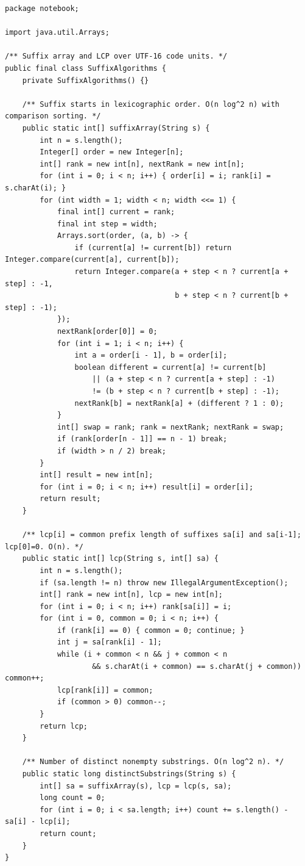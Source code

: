 \documentclass[10pt,letterpaper]{article}
\begin{document}
\begin{lstlisting}
package notebook;

import java.util.Arrays;

/** Suffix array and LCP over UTF-16 code units. */
public final class SuffixAlgorithms {
    private SuffixAlgorithms() {}

    /** Suffix starts in lexicographic order. O(n log^2 n) with comparison sorting. */
    public static int[] suffixArray(String s) {
        int n = s.length();
        Integer[] order = new Integer[n];
        int[] rank = new int[n], nextRank = new int[n];
        for (int i = 0; i < n; i++) { order[i] = i; rank[i] = s.charAt(i); }
        for (int width = 1; width < n; width <<= 1) {
            final int[] current = rank;
            final int step = width;
            Arrays.sort(order, (a, b) -> {
                if (current[a] != current[b]) return Integer.compare(current[a], current[b]);
                return Integer.compare(a + step < n ? current[a + step] : -1,
                                       b + step < n ? current[b + step] : -1);
            });
            nextRank[order[0]] = 0;
            for (int i = 1; i < n; i++) {
                int a = order[i - 1], b = order[i];
                boolean different = current[a] != current[b]
                    || (a + step < n ? current[a + step] : -1)
                    != (b + step < n ? current[b + step] : -1);
                nextRank[b] = nextRank[a] + (different ? 1 : 0);
            }
            int[] swap = rank; rank = nextRank; nextRank = swap;
            if (rank[order[n - 1]] == n - 1) break;
            if (width > n / 2) break;
        }
        int[] result = new int[n];
        for (int i = 0; i < n; i++) result[i] = order[i];
        return result;
    }

    /** lcp[i] = common prefix length of suffixes sa[i] and sa[i-1]; lcp[0]=0. O(n). */
    public static int[] lcp(String s, int[] sa) {
        int n = s.length();
        if (sa.length != n) throw new IllegalArgumentException();
        int[] rank = new int[n], lcp = new int[n];
        for (int i = 0; i < n; i++) rank[sa[i]] = i;
        for (int i = 0, common = 0; i < n; i++) {
            if (rank[i] == 0) { common = 0; continue; }
            int j = sa[rank[i] - 1];
            while (i + common < n && j + common < n
                    && s.charAt(i + common) == s.charAt(j + common)) common++;
            lcp[rank[i]] = common;
            if (common > 0) common--;
        }
        return lcp;
    }

    /** Number of distinct nonempty substrings. O(n log^2 n). */
    public static long distinctSubstrings(String s) {
        int[] sa = suffixArray(s), lcp = lcp(s, sa);
        long count = 0;
        for (int i = 0; i < sa.length; i++) count += s.length() - sa[i] - lcp[i];
        return count;
    }
}
\end{lstlisting}
\end{document}

